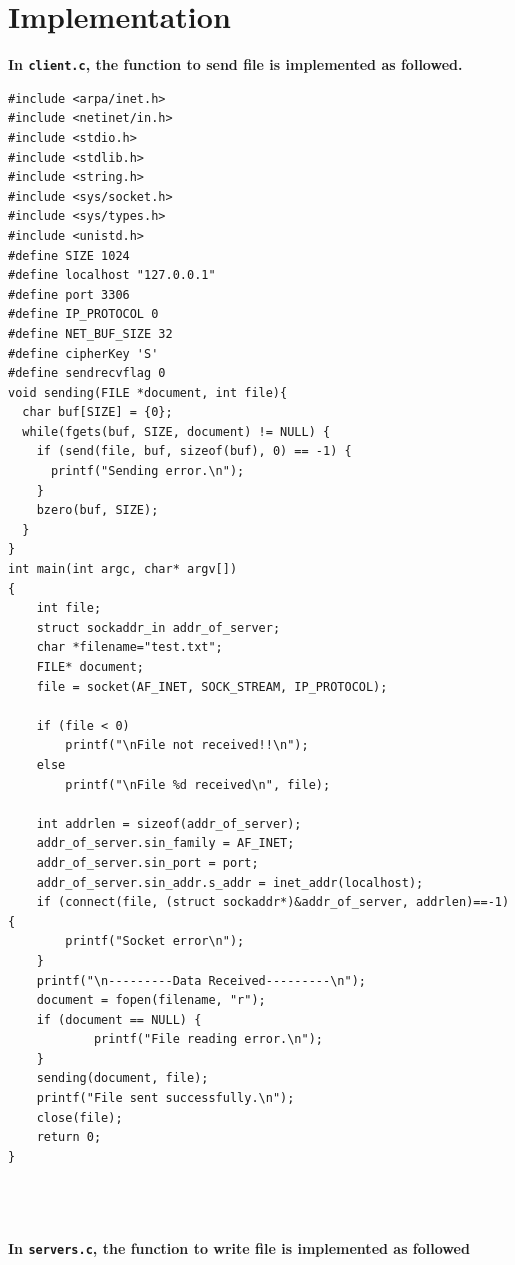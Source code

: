 \documentclass[12pt]{article}
\begin{document}
\section{Implementation}
\hspace{0.5cm}
\textbf{ In \texttt{client.c}, the function to send file is implemented as followed.}
\hspace{1cm}
\begin{verbatim}
#include <arpa/inet.h>
#include <netinet/in.h>
#include <stdio.h>
#include <stdlib.h>
#include <string.h>
#include <sys/socket.h>
#include <sys/types.h>
#include <unistd.h>
#define SIZE 1024
#define localhost "127.0.0.1"
#define port 3306
#define IP_PROTOCOL 0
#define NET_BUF_SIZE 32
#define cipherKey 'S'
#define sendrecvflag 0
void sending(FILE *document, int file){
  char buf[SIZE] = {0};
  while(fgets(buf, SIZE, document) != NULL) {
    if (send(file, buf, sizeof(buf), 0) == -1) {
      printf("Sending error.\n");
    }
    bzero(buf, SIZE);
  }
}
int main(int argc, char* argv[])
{
	int file;
	struct sockaddr_in addr_of_server;
	char *filename="test.txt";
	FILE* document;
	file = socket(AF_INET, SOCK_STREAM, IP_PROTOCOL);

	if (file < 0)
		printf("\nFile not received!!\n");
	else
		printf("\nFile %d received\n", file);

	int addrlen = sizeof(addr_of_server);
	addr_of_server.sin_family = AF_INET;
	addr_of_server.sin_port = port;
	addr_of_server.sin_addr.s_addr = inet_addr(localhost);
	if (connect(file, (struct sockaddr*)&addr_of_server, addrlen)==-1){
		printf("Socket error\n");
	}
	printf("\n---------Data Received---------\n");
	document = fopen(filename, "r");
  	if (document == NULL) {
    		printf("File reading error.\n");
  	}
  	sending(document, file);
  	printf("File sent successfully.\n");
  	close(file);
	return 0;
}


        
\end{verbatim}
\vspace{0.5cm}
\hspace{0.5cm}
 \textbf{In \texttt{servers.c}, the function to write file is implemented as followed}
 \hspace{1cm}
\end{document}

